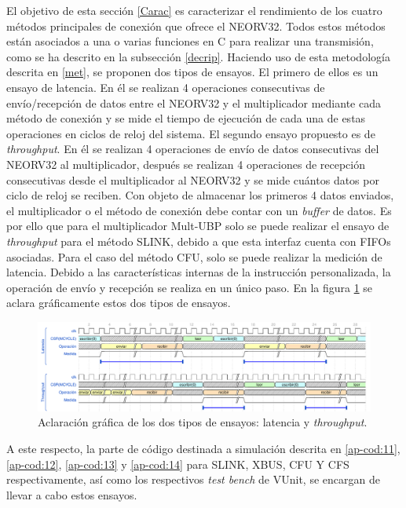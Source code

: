 El objetivo de esta sección \ref{Carac} es caracterizar el rendimiento de los cuatro métodos principales de conexión que ofrece el NEORV32.
Todos estos métodos están asociados a una o varias funciones en C para realizar una transmisión, como se ha descrito en la subsección \ref{decrip}.
Haciendo uso de esta metodología descrita en \ref{met}, se proponen dos tipos de ensayos.
El primero de ellos es un ensayo de latencia.
En él se realizan 4 operaciones consecutivas de envío/recepción de datos entre el NEORV32 y el multiplicador mediante cada método de conexión y se mide el tiempo de ejecución de cada una de estas operaciones en ciclos de reloj del sistema.
El segundo ensayo propuesto es de \textit{throughput}.
En él se realizan 4 operaciones de envío de datos consecutivas del NEORV32 al multiplicador, después se realizan 4 operaciones de recepción consecutivas desde el multiplicador al NEORV32 y se mide cuántos datos por ciclo de reloj se reciben.
Con objeto de almacenar los primeros 4 datos enviados, el multiplicador o el método de conexión debe contar con un \textit{buffer} de datos.
Es por ello que para el multiplicador Mult-UBP solo se puede realizar el ensayo de \textit{throughput} para el método SLINK, debido a que esta interfaz cuenta con FIFOs asociadas.
Para el caso del método CFU, solo se puede realizar la medición de latencia.
Debido a las características internas de la instrucción personalizada, la operación de envío y recepción se realiza en un único paso.
En la figura \ref{fig:lat-thr} se aclara gráficamente estos dos tipos de ensayos.

\begin{figure}[h!]
    \centering
    \includegraphics[width=14cm]{Figuras/wave_process.pdf}
    \caption{Aclaración gráfica de los dos tipos de ensayos: latencia y \textit{throughput}.}
    \label{fig:lat-thr}
\end{figure}

A este respecto, la parte de código destinada a simulación descrita en \ref{ap-cod:11}, \ref{ap-cod:12}, \ref{ap-cod:13} y \ref{ap-cod:14} para SLINK, XBUS, CFU Y CFS respectivamente, así como los respectivos \textit{test bench} de VUnit, se encargan de llevar a cabo estos ensayos.

